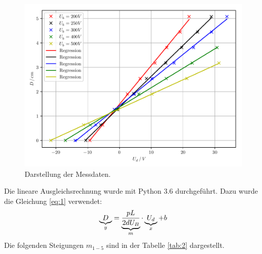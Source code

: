 \begin{figure}[H]
  \centering
  \includegraphics{plot1.pdf}
  \caption{Darstellung der Messdaten.}
  \label{abb:6}
\end{figure}
Die lineare Ausgleichsrechnung wurde mit Python 3.6 durchgeführt.
Dazu wurde die Gleichung \ref{eq:1} verwendet:
\begin{equation*}
  \underbrace{D}_{\mathclap{y}} = \underbrace{\frac{pL}{2dU_B}}_{\mathclap{m}} \cdot \underbrace{U_d}_{\mathclap{x}} + b
\end{equation*}
Die folgenden Steigungen $m_{1-5}$ sind in der Tabelle \ref{tab:2} dargestellt.

